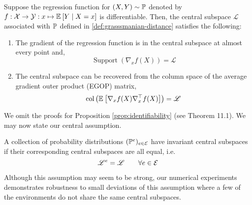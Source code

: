 \begin{proposition}
    \label{prop:identifiability}
    Suppose the regression function for $(X,Y) \sim \probability$ denoted by $f: \mathcal{X} \to \mathcal{Y}:x \mapsto \expectation{Y \conditional X = x}$ is differentiable. Then, the central subspace $\mathscr{L}$ associated with $\probability$ defined in \ref{def:grasssmanian-distance} satisfies the following:
    \begin{enumerate}[label=(\roman*)]
        \item The gradient of the regression function is in the central subspace at almost every point and,
        $$ \operatorname{ Support }( \nabla_x f(X) ) = \mathscr{L} $$
        \item The central subspace can be recovered from the column space of the average gradient outer product (EGOP) matrix,
        $$ \col \left(\expectation{ \nabla_x f(X) \nabla_x^{\T} f(X) } \right) = \mathscr{L} $$
    \end{enumerate} 
\end{proposition}
We omit the proofs for Proposition \ref{prop:identifiability} (see \citep{li2018sufficient} Theorem 11.1). 
We may now state our central assumption.
\begin{assumption}
    \label{assum:invariance}
    A collection of probability distributions $(\probability[e])_{e \in \environments}$ have invariant central subspaces if their corresponding central subspaces are all equal, i.e.
    $$ \mathscr{L}^e = \mathscr{L} \quad \quad \forall e \in \environments $$
\end{assumption}
Although this assumption may seem to be strong, our numerical experiments demonstrates robustness to small deviations of this assumption where a few of the environments do not share the same central subspaces.

